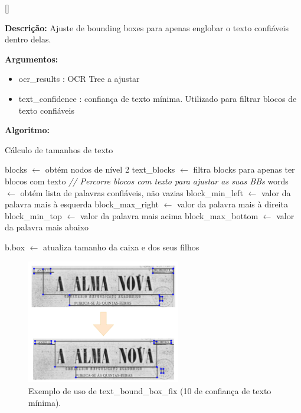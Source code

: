 [\normalsize]

\textbf{Descrição:} Ajuste de bounding boxes para apenas englobar o texto confiáveis dentro delas.

\textbf{Argumentos:}
\begin{itemize}\setlength\itemsep{-0.3em}
	\vspace{-0.5em}
	\item ocr\_results : OCR Tree a ajustar
	\item text\_confidence : confiança de texto mínima. Utilizado para filtrar blocos de texto confiáveis
\end{itemize}

\textbf{Algoritmo:}

\begin{breakablealgorithm}
	\caption{Cálculo de tamanhos de texto}
	\begin{algorithmic}[1]
		
		\State blocks $\leftarrow$ obtém nodos de nível 2
		\State text\_blocks $\leftarrow$ filtra blocks para apenas ter blocos com texto
		\State \textit{// Percorre blocos com texto para ajustar as suas BBs}
			\State words $\leftarrow$ obtém lista de palavras confiáveis, não vazias
			\State block\_min\_left $\leftarrow$ valor da palavra mais à esquerda
			\State block\_max\_right $\leftarrow$ valor da palavra mais à direita
			\State block\_min\_top $\leftarrow$ valor da palavra mais acima
			\State block\_max\_bottom $\leftarrow$ valor da palavra mais abaixo
			
				\State b.box $\leftarrow$ atualiza tamanho da caixa e dos seus filhos
			\EndIf
		\EndFor

		
	\end{algorithmic}
\end{breakablealgorithm}


\begin{figure}[H]
	\centering
	\includegraphics[width=0.6\textwidth]{images/ilustracoes/text_bound_box_fix_blocks.png}
	\caption{Exemplo de uso de text\_bound\_box\_fix (10 de confiança de texto mínima).}
	\label{fig:text_bound_box_fix_blocks}
\end{figure}


